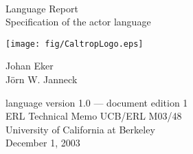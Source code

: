 
\thispagestyle{empty}


\HRule\\
\begin{flushright}
  {\Huge \Cal Language Report}\\\vspace{4mm}
  {\Large Specification of the \Cal actor language}\\
\end{flushright}
\HRule



\begin{center}
\texttt{[image: fig/CaltropLogo.eps]}
\end{center}
\begin{flushright}
\Large{Johan Eker\\ J{\"o}rn W. Janneck}
\end{flushright}
\begin{center}
  {\Large language version 1.0 --- document edition 1}\\\vspace{2mm}
  {\large ERL Technical Memo UCB/ERL M03/48 \\
  University of California at Berkeley \\
  December 1, 2003}
\end{center}











